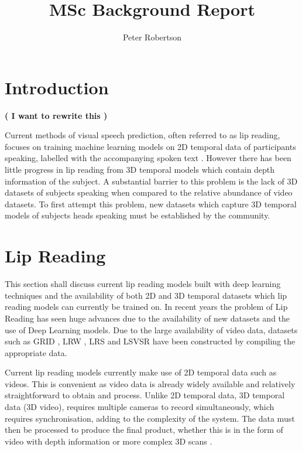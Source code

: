 \documentclass[12pt]{article}
\title{MSc Background Report}
\author{Peter Robertson}
\date{}
\begin{document}
\maketitle

\setcounter{page}{0}
\clearpage{\pagestyle{empty}\cleardoublepage}

\tableofcontents 
\clearpage{\pagestyle{empty}\cleardoublepage}


\setcounter{page}{1}

\section{Introduction}

\textbf{( I want to rewrite this )}

Current methods of visual speech prediction, often referred to as lip reading, focuses on training machine learning models on 2D temporal data of participants speaking, labelled with the accompanying spoken text \cite{Chung2016, Assael2016, Chung2017, Shillingford2018}.
However there has been little progress in lip reading from 3D temporal models which contain depth information of the subject.
A substantial barrier to this problem is the lack of 3D datasets of subjects speaking when compared to the relative abundance of video datasets.
To first attempt this problem, new datasets which capture 3D temporal models of subjects heads speaking must be established by the community.

\section{Lip Reading}
This section shall discuss current lip reading models built with deep learning techniques and the availability of both 2D and 3D temporal datasets which lip reading models can currently be trained on.
In recent years the problem of Lip Reading has seen huge advances due to the availability of new datasets and the use of Deep Learning models.
Due to the large availability of video data, datasets such as GRID \cite{Cooke2006}, LRW \cite{Chung2016}, LRS \cite{Chung2017} and LSVSR \cite{Shillingford2018} have been constructed by compiling the appropriate data.

Current lip reading models currently make use of 2D temporal data such as videos.
This is convenient as video data is already widely available and relatively straightforward to obtain and process.
Unlike 2D temporal data, 3D temporal data (3D video), requires multiple cameras to record simultaneously, which requires synchronisation, adding to the complexity of the system.
The data must then be processed to produce the final product, whether this is in the form of video with depth information or more complex 3D scans \cite{Li2017}.
\end{document}
